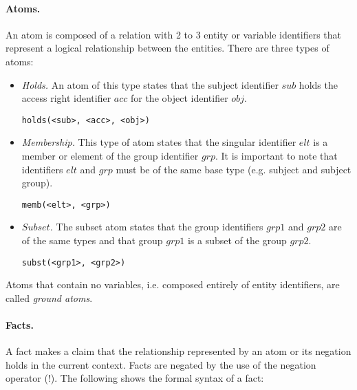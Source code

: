 \documentclass[10pt, twocolumn]{article}
\begin{document}
        \paragraph{Atoms.}
          An atom is composed of a relation with 2 to 3 entity or variable
          identifiers that represent a logical relationship between the
          entities. There are three types of atoms:

          \begin{itemize}
            \item
              {\em Holds.} An atom of this type states that the subject
              identifier $sub$ holds the access right identifier $acc$
              for the object identifier $obj$.
         
              \begin{verbatim}holds(<sub>, <acc>, <obj>)\end{verbatim}
            \item
              {\em Membership.} This type of atom states that the singular
              identifier $elt$ is a member or element of the group identifier
              $grp$. It is important to note that identifiers $elt$ and $grp$
              must be of the same base type (e.g. subject and subject group).
         
              \begin{verbatim}memb(<elt>, <grp>)\end{verbatim}
            \item
              {\em $Subset$.} The subset atom states that the group identifiers
              $grp1$ and $grp2$ are of the same types and that group $grp1$ is
              a subset of the group $grp2$.

              \begin{verbatim}subst(<grp1>, <grp2>)\end{verbatim}
          \end{itemize}

          Atoms that contain no variables, i.e. composed entirely of entity
          identifiers, are called {\em ground atoms}.

        \paragraph{Facts.}
          A fact makes a claim that the relationship represented by an atom or
          its negation holds in the current context. Facts are negated by the
          use of the negation operator ($!$). The following shows the formal
          syntax of a fact:
 
\end{document}
